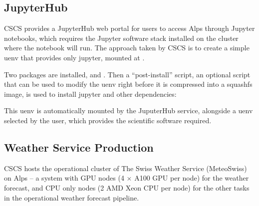 \subsection{JupyterHub}

CSCS provides a JupyterHub web portal for users to access Alps through Jupyter notebooks, which requires the Jupyter software stack installed on the cluster where the notebook will run.
The approach taken by CSCS is to create a simple  uenv that provides only jupyter, mounted at .

Two packages are installed,  and .
Then a ``post-install'' script, an optional script that can be used to modify the uenv right before it is compressed into a squashfs image, is used to install jupyter and other dependencies:



This uenv is automatically mounted by the JuputerHub service, alongside a uenv selected by the user, which provides the scientific software required.

\subsection{Weather Service Production}

CSCS hosts the operational cluster of The Swiss Weather Service (MeteoSwiss) on Alps -- a system with GPU nodes (4 $\times$ A100 GPU per node) for the weather forecast, and CPU only nodes (2 AMD Xeon CPU per node) for the other tasks in the operational weather forecast pipeline.

